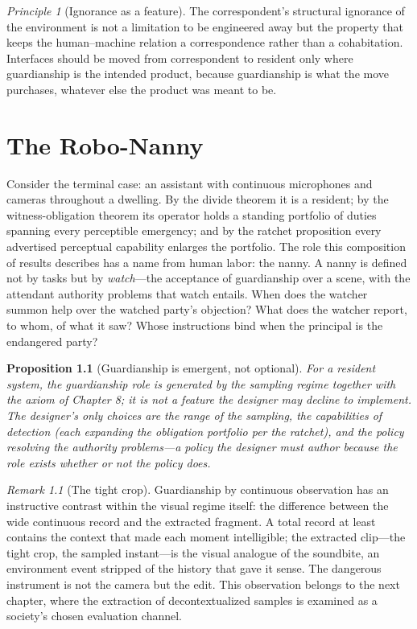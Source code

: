 \documentclass[11pt,oneside]{book}
\theoremstyle{plain}
\newtheorem{proposition}[theorem]{Proposition}
\theoremstyle{definition}
\theoremstyle{remark}
\newtheorem{remark}[theorem]{Remark}
\newtheorem{principle}[theorem]{Principle}
\begin{document}
\begin{principle}[Ignorance as a feature]
The correspondent's structural ignorance of the environment is not a limitation to be engineered away but the property that keeps the human--machine relation a correspondence rather than a cohabitation. Interfaces should be moved from correspondent to resident only where guardianship is the intended product, because guardianship is what the move purchases, whatever else the product was meant to be.
\end{principle}

\chapter{The Robo-Nanny}

Consider the terminal case: an assistant with continuous microphones and cameras throughout a dwelling. By the divide theorem it is a resident; by the witness-obligation theorem its operator holds a standing portfolio of duties spanning every perceptible emergency; and by the ratchet proposition every advertised perceptual capability enlarges the portfolio. The role this composition of results describes has a name from human labor: the nanny. A nanny is defined not by tasks but by \emph{watch}---the acceptance of guardianship over a scene, with the attendant authority problems that watch entails. When does the watcher summon help over the watched party's objection? What does the watcher report, to whom, of what it saw? Whose instructions bind when the principal is the endangered party?

\begin{proposition}[Guardianship is emergent, not optional]
For a resident system, the guardianship role is generated by the sampling regime together with the axiom of Chapter 8; it is not a feature the designer may decline to implement. The designer's only choices are the range of the sampling, the capabilities of detection (each expanding the obligation portfolio per the ratchet), and the policy resolving the authority problems---a policy the designer must author because the role exists whether or not the policy does.
\end{proposition}

\begin{remark}[The tight crop]
Guardianship by continuous observation has an instructive contrast within the visual regime itself: the difference between the wide continuous record and the extracted fragment. A total record at least contains the context that made each moment intelligible; the extracted clip---the tight crop, the sampled instant---is the visual analogue of the soundbite, an environment event stripped of the history that gave it sense. The dangerous instrument is not the camera but the edit. This observation belongs to the next chapter, where the extraction of decontextualized samples is examined as a society's chosen evaluation channel.
\end{remark}
\end{document}
